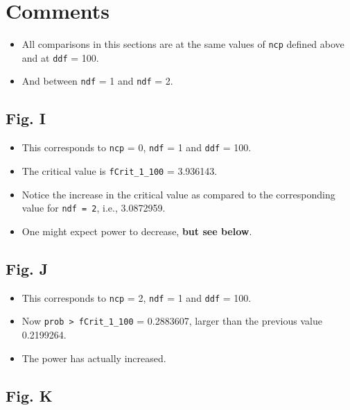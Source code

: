 \documentclass[]{book}
\providecommand{\tightlist}{%
  \setlength{\itemsep}{0pt}\setlength{\parskip}{0pt}}
\begin{document}
\hypertarget{comments-2}{%
\section{Comments}\label{comments-2}}

\begin{itemize}
\tightlist
\item
  All comparisons in this sections are at the same values of \texttt{ncp} defined above and at \texttt{ddf} = 100.
\item
  And between \texttt{ndf} = 1 and \texttt{ndf} = 2.
\end{itemize}

\hypertarget{fig.-i}{%
\subsection{Fig. I}\label{fig.-i}}

\begin{itemize}
\tightlist
\item
  This corresponds to \texttt{ncp} = 0, \texttt{ndf} = 1 and \texttt{ddf} = 100.
\item
  The critical value is \texttt{fCrit\_1\_100} = 3.936143.
\item
  Notice the increase in the critical value as compared to the corresponding value for \texttt{ndf\ =\ 2}, i.e., 3.0872959.
\item
  One might expect power to decrease, \textbf{but see below}.
\end{itemize}

\hypertarget{fig.-j}{%
\subsection{Fig. J}\label{fig.-j}}

\begin{itemize}
\tightlist
\item
  This corresponds to \texttt{ncp} = 2, \texttt{ndf} = 1 and \texttt{ddf} = 100.
\item
  Now \texttt{prob\ \textgreater{}\ fCrit\_1\_100} = 0.2883607, larger than the previous value 0.2199264.
\item
  The power has actually increased.
\end{itemize}

\hypertarget{fig.-k}{%
\subsection{Fig. K}\label{fig.-k}}
\end{document}
